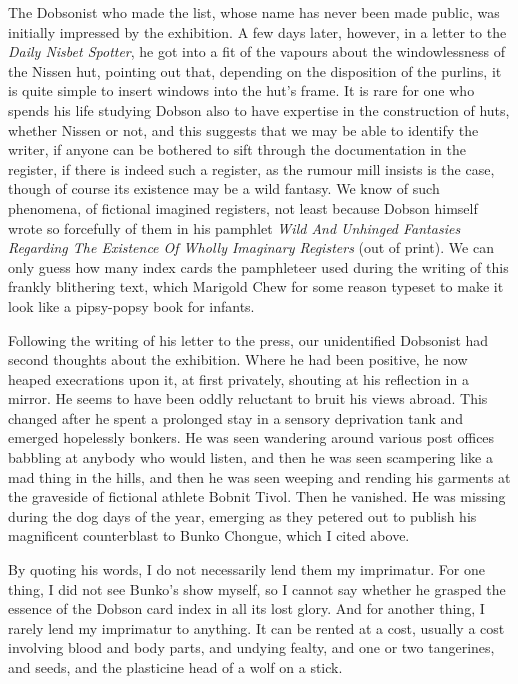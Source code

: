 The Dobsonist who made the list, whose name has never been made public, was initially impressed by the exhibition. A few days later, however, in a letter to the \emph{Daily Nisbet Spotter}, he got into a fit of the vapours about the windowlessness of the Nissen hut, pointing out that, depending on the disposition of the purlins, it is quite simple to insert windows into the hut's frame. It is rare for one who spends his life studying Dobson also to have expertise in the construction of huts, whether Nissen or not, and this suggests that we may be able to identify the writer, if anyone can be bothered to sift through the documentation in the register, if there is indeed such a register, as the rumour mill insists is the case, though of course its existence may be a wild fantasy. We know of such phenomena, of fictional imagined registers, not least because Dobson himself wrote so forcefully of them in his pamphlet \emph{Wild And Unhinged Fantasies Regarding The Existence Of Wholly Imaginary Registers} (out of print). We can only guess how many index cards the pamphleteer used during the writing of this frankly blithering text, which Marigold Chew for some reason typeset to make it look like a pipsy-popsy book for infants.

Following the writing of his letter to the press, our unidentified Dobsonist had second thoughts about the exhibition. Where he had been positive, he now heaped execrations upon it, at first privately, shouting at his reflection in a mirror. He seems to have been oddly reluctant to bruit his views abroad. This changed after he spent a prolonged stay in a sensory deprivation tank and emerged hopelessly bonkers. He was seen wandering around various post offices babbling at anybody who would listen, and then he was seen scampering like a mad thing in the hills, and then he was seen weeping and rending his garments at the graveside of fictional athlete Bobnit Tivol. Then he vanished. He was missing during the dog days of the year, emerging as they petered out to publish his magnificent counterblast to Bunko Chongue, which I cited above.

By quoting his words, I do not necessarily lend them my imprimatur. For one thing, I did not see Bunko's show myself, so I cannot say whether he grasped the essence of the Dobson card index in all its lost glory. And for another thing, I rarely lend my imprimatur to anything. It can be rented at a cost, usually a cost involving blood and body parts, and undying fealty, and one or two tangerines, and seeds, and the plasticine head of a wolf on a stick.